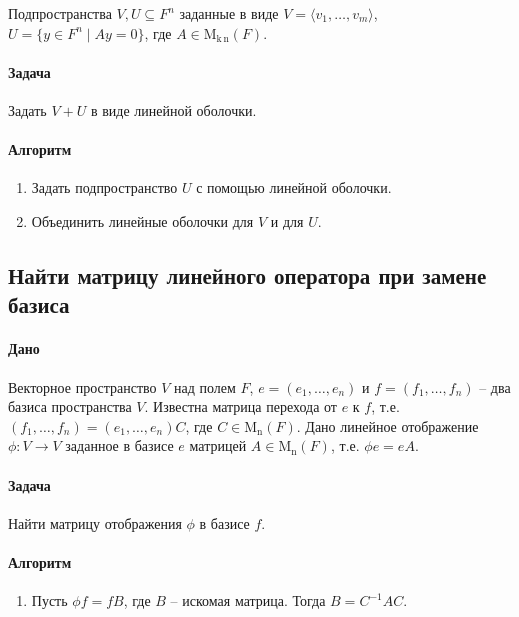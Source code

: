 \documentclass{article}
\newcommand{\MatrixDim}[3]{\operatorname{\mathrm{M}_{#2\,#3}}(#1)}
\newcommand{\Matrix}[2]{\operatorname{\mathrm{M}_{#2}}(#1)}
\begin{document}
Подпространства $V,U\subseteq F^{n}$ заданные в виде $V =\langle v_1,\ldots,v_m\rangle$, $U = \{y\in F^{n}\mid Ay = 0\}$, где $A\in \MatrixDim{F}{k}{n}$.

\paragraph{Задача}

Задать $V + U$ в виде линейной оболочки.

\paragraph{Алгоритм}

\begin{enumerate}
\item Задать подпространство $U$ с помощью линейной оболочки.

\item Объединить линейные оболочки для $V$ и для $U$.
\end{enumerate}

\subsection{Найти матрицу линейного оператора при замене базиса}

\paragraph{Дано}

Векторное пространство $V$ над полем $F$, $e=(e_1,\ldots,e_n)$ и $f = (f_1,\ldots,f_n)$ -- два базиса пространства $V$.
Известна матрица перехода от $e$ к $f$, т.е.
$(f_1,\ldots,f_n) = (e_1,\ldots,e_n)C$, где $C\in \Matrix{F}{n}$.
Дано линейное отображение $\phi\colon V\to V$ заданное в базисе $e$ матрицей $A\in\Matrix{F}{n}$, т.е. $\phi e = e A$.

\paragraph{Задача}

Найти матрицу отображения $\phi$ в базисе $f$.

\paragraph{Алгоритм}

\begin{enumerate}
\item Пусть $\phi f = f B$, где $B$ -- искомая матрица.
Тогда $B = C^{-1} A C$.
\end{enumerate}
\end{document}
